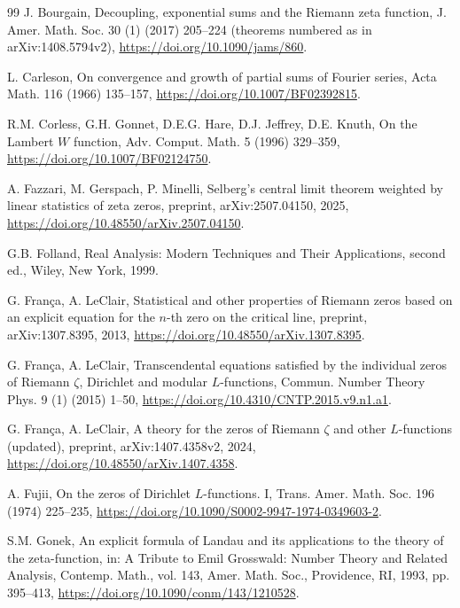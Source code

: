 \documentclass[preprint,12pt]{elsarticle}
\numberwithin{equation}{section}
\theoremstyle{plain}
\theoremstyle{definition}
\theoremstyle{remark}
\begin{document}
\begin{thebibliography}{99}
J. Bourgain, Decoupling, exponential sums and the Riemann zeta function, J. Amer. Math. Soc. 30 (1) (2017) 205--224 (theorems numbered as in arXiv:1408.5794v2), \href{https://doi.org/10.1090/jams/860}{https://doi.org/10.1090/jams/860}.

L. Carleson, On convergence and growth of partial sums of Fourier series, Acta Math. 116 (1966) 135--157, \href{https://doi.org/10.1007/BF02392815}{https://doi.org/10.1007/BF02392815}.

R.M. Corless, G.H. Gonnet, D.E.G. Hare, D.J. Jeffrey, D.E. Knuth, On the Lambert $W$ function, Adv. Comput. Math. 5 (1996) 329--359, \href{https://doi.org/10.1007/BF02124750}{https://doi.org/10.1007/BF02124750}.

A. Fazzari, M. Gerspach, P. Minelli, Selberg's central limit theorem weighted by linear statistics of zeta zeros, preprint, arXiv:2507.04150, 2025, \href{https://doi.org/10.48550/arXiv.2507.04150}{https://doi.org/10.48550/arXiv.2507.04150}.

G.B. Folland, Real Analysis: Modern Techniques and Their Applications, second ed., Wiley, New York, 1999.

G. Fran\c{c}a, A. LeClair, Statistical and other properties of Riemann zeros based on an explicit equation for the $n$-th zero on the critical line, preprint, arXiv:1307.8395, 2013, \href{https://doi.org/10.48550/arXiv.1307.8395}{https://doi.org/10.48550/arXiv.1307.8395}.

G. Fran\c{c}a, A. LeClair, Transcendental equations satisfied by the individual zeros of Riemann $\zeta$, Dirichlet and modular $L$-functions, Commun. Number Theory Phys. 9 (1) (2015) 1--50, \href{https://doi.org/10.4310/CNTP.2015.v9.n1.a1}{https://doi.org/10.4310/CNTP.2015.v9.n1.a1}.

G. Fran\c{c}a, A. LeClair, A theory for the zeros of Riemann $\zeta$ and other $L$-functions (updated), preprint, arXiv:1407.4358v2, 2024, \href{https://doi.org/10.48550/arXiv.1407.4358}{https://doi.org/10.48550/arXiv.1407.4358}.

A. Fujii, On the zeros of Dirichlet $L$-functions. I, Trans. Amer. Math. Soc. 196 (1974) 225--235, \href{https://doi.org/10.1090/S0002-9947-1974-0349603-2}{https://doi.org/10.1090/S0002-9947-1974-0349603-2}.

S.M. Gonek, An explicit formula of Landau and its applications to the theory of the zeta-function, in: A Tribute to Emil Grosswald: Number Theory and Related Analysis, Contemp. Math., vol. 143, Amer. Math. Soc., Providence, RI, 1993, pp. 395--413, \href{https://doi.org/10.1090/conm/143/1210528}{https://doi.org/10.1090/conm/143/1210528}.


\end{thebibliography}
\end{document}
